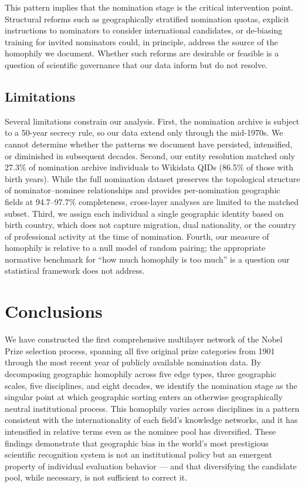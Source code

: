 \documentclass[11pt]{article}
\begin{document}
This pattern implies that the nomination stage is the critical intervention point. Structural reforms such as geographically stratified nomination quotas, explicit instructions to nominators to consider international candidates, or de-biasing training for invited nominators could, in principle, address the source of the homophily we document. Whether such reforms are desirable or feasible is a question of scientific governance that our data inform but do not resolve.

\subsection{Limitations}

Several limitations constrain our analysis. First, the nomination archive is subject to a 50-year secrecy rule, so our data extend only through the mid-1970s. We cannot determine whether the patterns we document have persisted, intensified, or diminished in subsequent decades. Second, our entity resolution matched only 27.3\% of nomination archive individuals to Wikidata QIDs (86.5\% of those with birth years). While the full nomination dataset preserves the topological structure of nominator--nominee relationships and provides per-nomination geographic fields at 94.7--97.7\% completeness, cross-layer analyses are limited to the matched subset. Third, we assign each individual a single geographic identity based on birth country, which does not capture migration, dual nationality, or the country of professional activity at the time of nomination. Fourth, our measure of homophily is relative to a null model of random pairing; the appropriate normative benchmark for ``how much homophily is too much'' is a question our statistical framework does not address.

\section{Conclusions}
\label{sec:conclusions}

We have constructed the first comprehensive multilayer network of the Nobel Prize selection process, spanning all five original prize categories from 1901 through the most recent year of publicly available nomination data. By decomposing geographic homophily across five edge types, three geographic scales, five disciplines, and eight decades, we identify the nomination stage as the singular point at which geographic sorting enters an otherwise geographically neutral institutional process. This homophily varies across disciplines in a pattern consistent with the internationality of each field's knowledge networks, and it has intensified in relative terms even as the nominee pool has diversified. These findings demonstrate that geographic bias in the world's most prestigious scientific recognition system is not an institutional policy but an emergent property of individual evaluation behavior --- and that diversifying the candidate pool, while necessary, is not sufficient to correct it.
\end{document}
